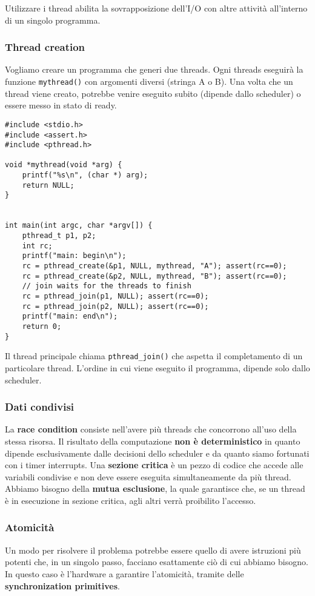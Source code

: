 \documentclass[12pt, twoside, letterpaper]{article}
\begin{document}
			Utilizzare i thread abilita la sovrapposizione dell'I/O con altre attività all'interno di un singolo programma.
			
			\subsubsection{Thread creation}
				Vogliamo creare un programma che generi due threads. Ogni threads eseguirà la funzione \texttt{mythread()} con argomenti diversi (stringa A o B). Una volta che un thread viene creato, potrebbe venire eseguito subito (dipende dallo scheduler) o essere messo in stato di ready. 
				\begin{lstlisting}[style=CStyle]
#include <stdio.h>
#include <assert.h>
#include <pthread.h>

void *mythread(void *arg) {
	printf("%s\n", (char *) arg);
	return NULL;
}


int main(int argc, char *argv[]) {
	pthread_t p1, p2;
	int rc;
	printf("main: begin\n");
	rc = pthread_create(&p1, NULL, mythread, "A"); assert(rc==0);
	rc = pthread_create(&p2, NULL, mythread, "B"); assert(rc==0);
	// join waits for the threads to finish
	rc = pthread_join(p1, NULL); assert(rc==0);
	rc = pthread_join(p2, NULL); assert(rc==0);
	printf("main: end\n");
	return 0;
} 				\end{lstlisting}
				Il thread principale chiama \texttt{pthread\_join()} che aspetta il completamento di un particolare thread. L'ordine in cui viene eseguito il programma, dipende solo dallo scheduler.
			
			\subsubsection{Dati condivisi}
				La \textbf{race condition} consiste nell'avere più threads che concorrono all'uso della stessa risorsa. Il risultato della computazione \textbf{non è deterministico} in quanto dipende esclusivamente dalle decisioni dello scheduler e da quanto siamo fortunati con i timer interrupts. Una \textbf{sezione critica} è un pezzo di codice che accede alle variabili condivise e non deve essere eseguita simultaneamente da più thread. Abbiamo bisogno della \textbf{mutua esclusione}, la quale garantisce che, se un thread è in esecuzione in sezione critica, agli altri verrà proibilito l'accesso.
				
			\subsubsection{Atomicità}
				Un modo per risolvere il problema potrebbe essere quello di avere istruzioni più potenti che, in un singolo passo, facciano esattamente ciò di cui abbiamo bisogno. In questo caso è l'hardware a garantire l'atomicità, tramite delle \textbf{synchronization primitives}.
				
\end{document}
